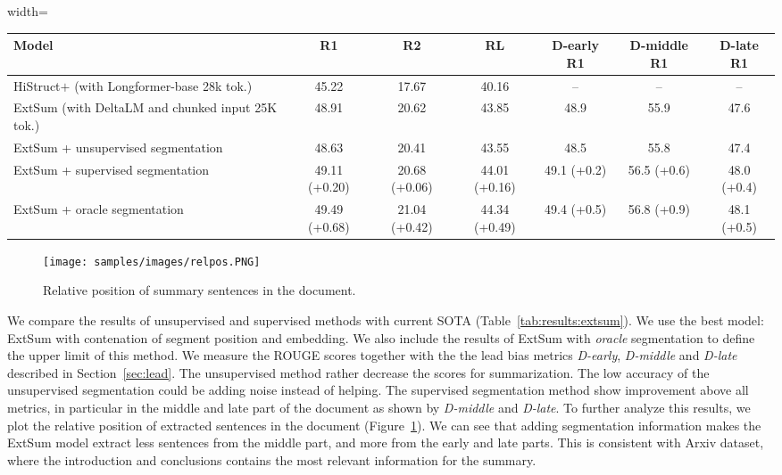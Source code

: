 \documentclass[sigconf]{acmart}
\begin{document}
\begin{table*}
	\centering
	\begin{adjustbox}{width=\linewidth}
	\begin{tabular}{l c c c | c c c} 
		\toprule
		\textbf{Model} & \textbf{R1} &  \textbf{R2} &  \textbf{RL} & \textbf{D-early R1}  & \textbf{D-middle R1} & \textbf{D-late R1} \\ \hline	
		HiStruct$+$ (with Longformer-base 28k tok.) \cite{ruan-etal-2022-histruct} & 45.22 & 17.67 & 40.16 & -- & -- & -- \\ \hline
        ExtSum (with DeltaLM and chunked input 25K tok.) &	48.91	&20.62 &43.85 & 48.9&	55.9&	47.6\\
        ExtSum + unsupervised segmentation	& 48.63&	20.41&	43.55 & 48.5 & 55.8 & 47.4 \\
        ExtSum + supervised segmentation	&49.11 (+0.20)	&20.68 (+0.06)	&44.01 (+0.16)    &49.1 (+0.2)	&56.5 (+0.6)	&48.0 (+0.4) \\
        ExtSum + oracle segmentation	&49.49 (+0.68)	&21.04 (+0.42)	&44.34 (+0.49)   &49.4 (+0.5)	&56.8 (+0.9)	&48.1 (+0.5) \\
		\bottomrule
	\end{tabular} 
	\end{adjustbox}
	\caption{Evaluation results of using text segmentation in extractive summarization on Arxiv test-set}
	\label{tab:results:extsum}
\end{table*}

\begin{figure}
  \centering
  \texttt{[image: samples/images/relpos.PNG]}
  \caption{ Relative position of summary sentences in the document.}
  \label{fig:relpos} 
\end{figure}

We compare the results of unsupervised and supervised methods with current SOTA  \cite{ruan-etal-2022-histruct} (Table~\ref{tab:results:extsum}). We use the best model: ExtSum with contenation of segment position and embedding. We also include the results of ExtSum with \emph{oracle} segmentation to define the upper limit of this method. We measure the ROUGE scores  together with the the lead bias metrics \emph{D-early}, \emph{D-middle} and \emph{D-late} described in Section~\ref{sec:lead}. The unsupervised method rather decrease the scores for summarization. The low accuracy of the unsupervised segmentation could be adding noise instead of helping.  The supervised segmentation method show improvement above all metrics, in particular in the middle and late part of the document as shown by \emph{D-middle} and \emph{D-late}. To further analyze this results, we plot the relative position of extracted sentences in the document (Figure~\ref{fig:relpos}). We can see that adding segmentation information makes the ExtSum model extract less sentences from the middle part, and more from the early and late parts. This is consistent with Arxiv dataset, where the introduction and conclusions contains the most relevant information for the summary.
\end{document}
